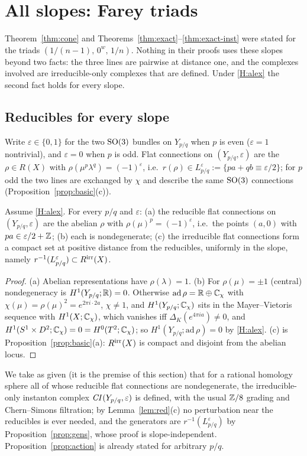 \section{All slopes: Farey triads}\label{sec:allslopes}
Theorem~\ref{thm:cone} and Theorems~\ref{thm:exact}--\ref{thm:exact-inst} were stated for the triads
$(1/(n-1),\,0^w,\,1/n)$.  Nothing in their proofs uses these slopes beyond two facts: the three lines are pairwise at
distance one, and the complexes involved are irreducible-only complexes that are defined.  Under \ref{H:alex} the
second fact holds for every slope.

\subsection{Reducibles for every slope}
Write $\varepsilon\in\{0,1\}$ for the two $\operatorname{SO}(3)$ bundles on $Y_{p/q}$ when $p$ is even ($\varepsilon=1$ nontrivial), and
$\varepsilon=0$ when $p$ is odd.  Flat connections on $(Y_{p/q},\varepsilon)$ are the $\rho\in R(X)$ with
$\rho(\mu^p\lambda^q)=(-1)^\varepsilon$, i.e.\ $r(\rho)\in L^{\varepsilon}_{p/q}:=\{pa+qb\equiv\varepsilon/2\}$; for $p$ odd the two
lines are exchanged by $\chi$ and describe the same $\operatorname{SO}(3)$ connections (Proposition~\ref{prop:basic}(c)).

\begin{lemma}\label{lem:red}
Assume \ref{H:alex}.  For every $p/q$ and $\varepsilon$: (a) the reducible flat connections on $(Y_{p/q},\varepsilon)$ are the
abelian $\rho$ with $\rho(\mu)^p=(-1)^\varepsilon$, i.e.\ the points $(a,0)$ with $pa\in\varepsilon/2+\mathbb{Z}$; (b) each is
nondegenerate; (c) the irreducible flat connections form a compact set at positive distance from the reducibles,
uniformly in the slope, namely $r^{-1}(L^\varepsilon_{p/q})\subset R^{\rm irr}(X)$.
\end{lemma}
\begin{proof}
(a) Abelian representations have $\rho(\lambda)=1$.  (b) For $\rho(\mu)=\pm1$ (central) nondegeneracy is
$H^1(Y_{p/q};\mathbb{R})=0$.  Otherwise $\mathrm{ad}\,\rho=\mathbb{R}\oplus\mathbb{C}_\chi$ with $\chi(\mu)=\rho(\mu)^2=e^{2\pi i\cdot2a}$,
$\chi\ne1$, and $H^1(Y_{p/q};\mathbb{C}_\chi)$ sits in the Mayer--Vietoris sequence with $H^1(X;\mathbb{C}_\chi)$, which vanishes iff
$\Delta_K(e^{4\pi ia})\neq0$, and $H^1(S^1\times D^2;\mathbb{C}_\chi)=0=H^0(T^2;\mathbb{C}_\chi)$; so $H^1(Y_{p/q};\mathrm{ad}\,\rho)=0$ by
\ref{H:alex}.  (c) is Proposition~\ref{prop:basic}(a): $R^{\rm irr}(X)$ is compact and disjoint from the abelian locus.
\end{proof}
We take as given (it is the premise of this section) that for a rational homology sphere all of whose reducible
flat connections are nondegenerate, the irreducible-only instanton complex $\mathit{CI}(Y_{p/q},\varepsilon)$ is defined, with
the usual $\mathbb{Z}/8$ grading and Chern--Simons filtration; by Lemma~\ref{lem:red}(c) no perturbation near the reducibles
is ever needed, and the generators are $r^{-1}(L^\varepsilon_{p/q})$ by Proposition~\ref{prop:gens}, whose proof is
slope-independent.  Proposition~\ref{prop:action} is already stated for arbitrary $p/q$.

